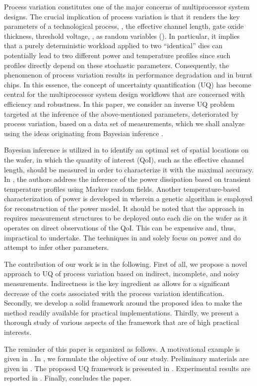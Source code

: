 Process variation constitutes one of the major concerns of multiprocessor system designs. The crucial implication of process variation is that it renders the key parameters of a technological process, \eg, the effective channel length, gate oxide thickness, threshold voltage, \etc, as random variables (\rvs). In particular, it implies that a purely deterministic workload applied to two ``identical'' dies can potentially lead to two different power and temperature profiles since such profiles directly depend on these stochastic parameters. Consequently, the phenomenon of process variation results in performance degradation and in burnt chips. In this essence, the concept of uncertainty quantification (UQ) has become central for the multiprocessor system design workflows that are concerned with efficiency and robustness. In this paper, we consider an inverse UQ problem targeted at the inference of the above-mentioned parameters, deteriorated by process variation, based on a data set of measurements, which we shall analyze using the ideas originating from Bayesian inference \cite{gelman2004}.

Bayesian inference is utilized in \cite{zhang2010} to identify an optimal set of spatial locations on the wafer, in which the quantity of interest (QoI), such as the effective channel length, should be measured in order to characterize it with the maximal accuracy. In \cite{paek2012}, the authors address the inference of the power dissipation based on transient temperature profiles using Markov random fields. Another temperature-based characterization of power is developed in \cite{mesa-martinez2007} wherein a genetic algorithm is employed for reconstruction of the power model. It should be noted that the approach in \cite{zhang2010} requires measurement structures to be deployed onto each die on the wafer as it operates on direct observations of the QoI. This can be expensive and, thus, impractical to undertake. The techniques in \cite{paek2012} and \cite{mesa-martinez2007} solely focus on power and do attempt to infer other parameters.

The contribution of our work is in the following. First of all, we propose a novel approach to UQ of process variation based on indirect, incomplete, and noisy measurements. Indirectness is the key ingredient as allows for a significant decrease of the costs associated with the process variation identification. Secondly, we develop a solid framework around the proposed idea to make the method readily available for practical implementations. Thirdly, we present a thorough study of various aspects of the framework that are of high practical interests.

The reminder of this paper is organized as follows. A motivational example is given in . In , we formulate the objective of our study. Preliminary materials are given in . The proposed UQ framework is presented in . Experimental results are reported in . Finally,  concludes the paper.
